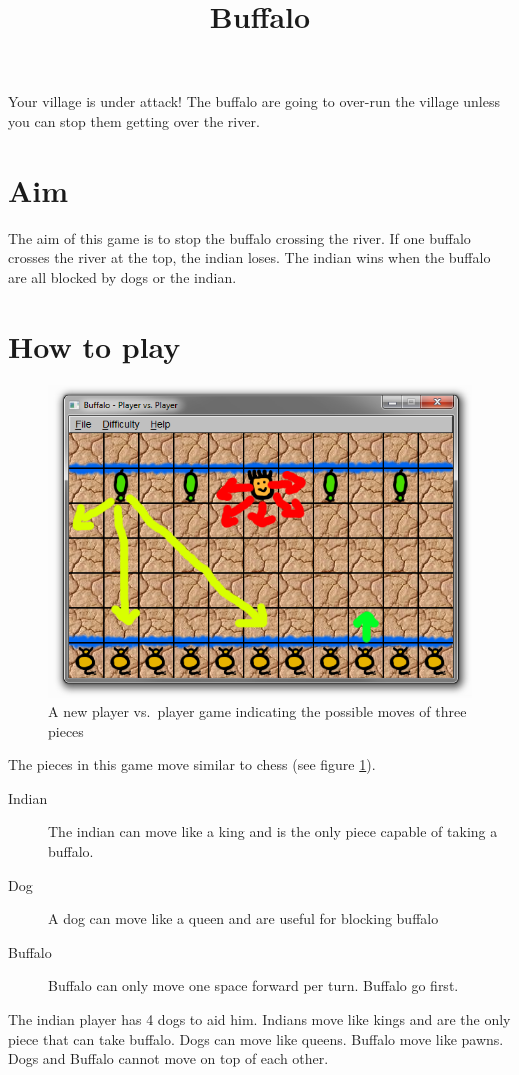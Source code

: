\documentclass[a4paper]{article}
\begin{document}
\title{Buffalo}
\author{}
\date{}

\maketitle

Your village is under attack! The buffalo are going to over-run the village unless you can stop them getting over the river.

\section*{Aim}
The aim of this game is to stop the buffalo crossing the river. If one buffalo crosses the river at the top, the indian loses. The indian wins when the buffalo are all blocked by dogs or the indian.

\section*{How to play}
\begin{figure}[htb]
	\begin{center}
		\includegraphics[width=\linewidth]{figureinstructins.png}
	\end{center}
	\caption{A new player vs.\ player game indicating the possible moves of three pieces}
	\label{fig:instructins}
\end{figure}
The pieces in this game move similar to chess (see figure \ref{fig:instructins}).
\begin{description}
	\item[Indian] The indian can move like a king and is the only piece capable of taking a buffalo.
	\item[Dog] A dog can move like a queen and are useful for blocking buffalo
	\item[Buffalo] Buffalo can only move one space forward per turn. Buffalo go first.
\end{description}
The indian player has 4 dogs to aid him. Indians move like kings and are the only piece that can take buffalo. Dogs can move like queens. Buffalo move like pawns. Dogs and Buffalo cannot move on top of each other.
\end{document}
